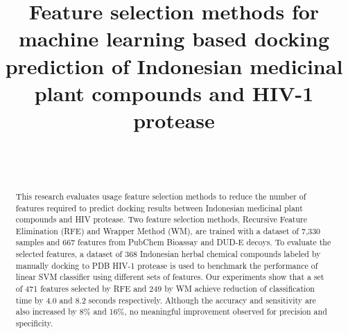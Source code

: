 \documentclass[conference]{IEEEtran}
\begin{document}
\title{Feature selection methods for machine learning based docking prediction of Indonesian medicinal plant compounds and HIV-1 protease}



\author{
	\and
}

\author{
	\\
	
	\\
	
}

\maketitle

\begin{abstract}
	
	This research evaluates usage feature selection methods to reduce the number of features required to predict docking results between Indonesian medicinal plant compounds and HIV protease. Two feature selection methods, Recursive Feature Elimination (RFE) and Wrapper Method (WM), are trained with a dataset of 7,330 samples and 667 features from PubChem Bioassay and DUD-E decoys. To evaluate the selected features, a dataset of 368 Indonesian herbal chemical compounds labeled by manually docking to PDB HIV-1 protease is used to benchmark the performance of linear SVM classifier using different sets of features. Our experiments show that a set of 471 features selected by RFE and 249 by WM achieve reduction of classification time by 4.0 and 8.2 seconds respectively. Although the accuracy and sensitivity are also increased by 8\% and 16\%, no meaningful improvement observed for precision and specificity.  
	
\end{abstract}
\end{document}
